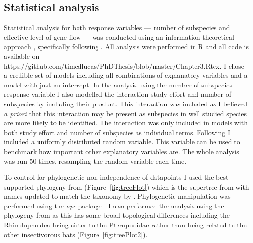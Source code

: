 \subsection{Statistical analysis}

Statistical analysis for both response variables --- number of subspecies and effective level of gene flow --- was conducted using an information theoretical approach \cite{burnham2002model}, specifically following \textcite{whittingham2005habitat, whittingham2006we}.
All analysis were performed in R \cite{R} and all code is available on \url{https://github.com/timcdlucas/PhDThesis/blob/master/Chapter3.Rtex}.
I chose a credible set of models including all combinations of explanatory variables and a model with just an intercept.
In the analysis using the number of subspecies response variable I also modelled the interaction study effort and number of subspecies by including their product.
This interaction was included as I believed \emph{a priori} that this interaction may be present as subspecies in well studied species are more likely to be identified.
The interaction was only included in models with both study effort and number of subspecies as individual terms.
Following \textcite{whittingham2005habitat} I included a uniformly distributed random variable.
This variable can be used to benchmark how important other explanatory variables are.
The whole analysis was run 50 times, resampling the random variable each time.


To control for phylogenetic non-independence of datapoints I used the best-supported phylogeny from \textcite{fritz2009geographical} (Figure~\ref{fig:treePlot}) which is the supertree from \textcite{bininda2007delayed} with names updated to match the taxonomy by \textcite{wilson2005mammal}.
Phylogenetic manipulation was performed using the \emph{ape} package \cite{ape}.
I also performed the analysis using the phylogeny from \textcite{jones2005bats} as this has some broad topological differences including the Rhinolophoidea being sister to the Pteropodidae rather than being related to the other insectivorous bats (Figure~\ref{fig:treePlot2}). 







